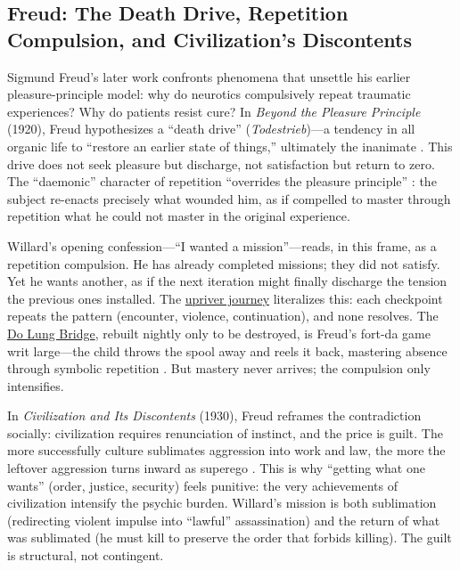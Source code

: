 \subsection*{Freud: The Death Drive, Repetition Compulsion, and Civilization's Discontents}
\label{ssec:vi-freud}

Sigmund Freud's later work confronts phenomena that unsettle his earlier pleasure-principle
model: why do neurotics compulsively repeat traumatic experiences? Why do patients resist cure?
In \textit{Beyond the Pleasure Principle} (1920), Freud hypothesizes a ``death drive''
(\emph{Todestrieb})---a tendency in all organic life to ``restore an earlier state of things,''
ultimately the inanimate \parencite[p.~38]{FreudBeyond1955}. This drive does not seek pleasure
but discharge, not satisfaction but return to zero. The ``daemonic'' character of repetition
``overrides the pleasure principle'' \parencite[p.~22]{FreudBeyond1955}: the subject
re-enacts precisely what wounded him, as if compelled to master through repetition what he
could not master in the original experience.

Willard's opening confession---``I wanted a mission''---reads, in this frame, as a repetition
compulsion. He has already completed missions; they did not satisfy. Yet he wants another, as
if the next iteration might finally discharge the tension the previous ones installed. The
\hyperref[scene:upriver-journey]{upriver journey} literalizes this: each checkpoint repeats
the pattern (encounter, violence, continuation), and none resolves. The
\hyperref[scene:do-lung-bridge]{Do Lung Bridge}, rebuilt nightly only to be destroyed, is
Freud's fort-da game writ large---the child throws the spool away and reels it back,
mastering
absence through symbolic repetition \parencite[pp.~14--16]{FreudBeyond1955}. But mastery never
arrives; the compulsion only intensifies.

In \textit{Civilization and Its Discontents} (1930), Freud reframes the contradiction
socially: civilization requires renunciation of instinct, and the price is guilt. The more
successfully culture sublimates aggression into work and law, the more the leftover aggression
turns inward as superego \parencite[pp.~70--97]{FreudCivilization1961}. This is why ``getting
what one wants'' (order, justice, security) feels punitive: the very achievements of
civilization intensify the psychic burden. Willard's mission is both sublimation (redirecting
violent impulse into ``lawful'' assassination) and the return of what was sublimated (he must
kill to preserve the order that forbids killing). The guilt is structural, not contingent.

